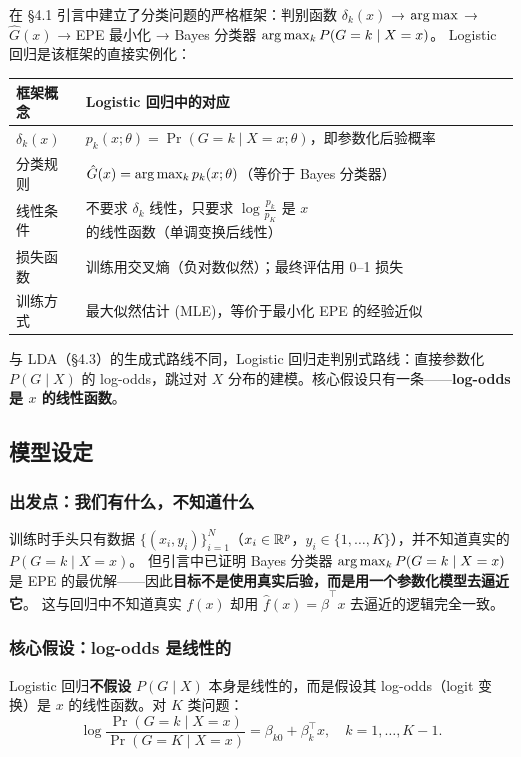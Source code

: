 在 §4.1 引言中建立了分类问题的严格框架：判别函数 $\delta_k(x)$ → $\arg\max$ → $\hat{G}(x)$ → EPE 最小化 → Bayes 分类器 $\arg\max_k P(G=k\mid X=x)$。
Logistic 回归是该框架的直接实例化：

\begin{center}
\begin{tabular}{ll}
\toprule
框架概念 & Logistic 回归中的对应 \\
\midrule
$\delta_k(x)$ & $p_k(x; \theta) = \Pr(G = k \mid X = x; \theta)$，即参数化后验概率 \\
分类规则 & $\hat{G}(x) = \arg\max_k p_k(x; \theta)$（等价于 Bayes 分类器） \\
线性条件 & 不要求 $\delta_k$ 线性，只要求 $\log\frac{p_k}{p_K}$ 是 $x$ 的线性函数（单调变换后线性） \\
损失函数 & 训练用交叉熵（负对数似然）；最终评估用 0--1 损失 \\
训练方式 & 最大似然估计 (MLE)，等价于最小化 EPE 的经验近似 \\
\bottomrule
\end{tabular}
\end{center}

与 LDA（§4.3）的生成式路线不同，Logistic 回归走判别式路线：直接参数化 $P(G\mid X)$ 的 log-odds，跳过对 $X$ 分布的建模。核心假设只有一条——\textbf{log-odds 是 $x$ 的线性函数}。

\subsection{模型设定}

\subsubsection{出发点：我们有什么，不知道什么}

训练时手头只有数据 $\{(x_i, y_i)\}_{i=1}^{N}$（$x_i \in \mathbb{R}^p$，$y_i \in \{1,\ldots,K\}$），并不知道真实的 $P(G=k \mid X=x)$。
但引言中已证明 Bayes 分类器 $\arg\max_k P(G=k\mid X=x)$ 是 EPE 的最优解——因此\textbf{目标不是使用真实后验，而是用一个参数化模型去逼近它}。
这与回归中不知道真实 $f(x)$ 却用 $\hat{f}(x)=\hat{\beta}^\top x$ 去逼近的逻辑完全一致。

\subsubsection{核心假设：log-odds 是线性的}

Logistic 回归\textbf{不假设} $P(G\mid X)$ 本身是线性的，而是假设其 log-odds（logit 变换）是 $x$ 的线性函数。对 $K$ 类问题：
\begin{equation}\label{eq:multilogit}
    \log\frac{\Pr(G = k \mid X = x)}{\Pr(G = K \mid X = x)} = \beta_{k0} + \beta_k^\top x, \quad k = 1, \ldots, K-1.
\end{equation}


